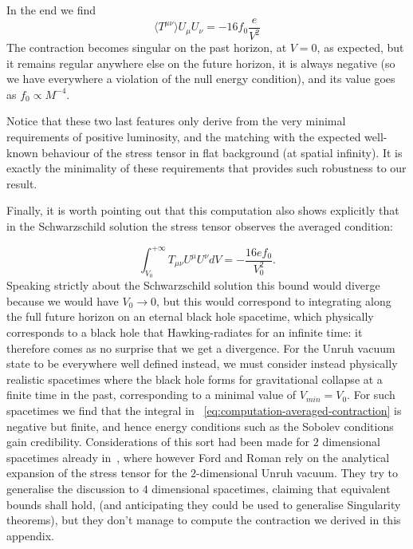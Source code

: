 In the end we find
\begin{equation}
    \label{eq:contraction-stress-tensor}
    \langle T^{\mu\nu}\rangle U_{\mu}U_{\nu} =  -16f_0\frac{e}{V^2}
\end{equation}
The contraction becomes singular on the past horizon, at \(V = 0\), as expected, but it remains regular anywhere else on the future horizon, it is always negative (so we have everywhere a violation of the null energy condition), and its value goes as \(f_0 \propto M^{-4}\). 

Notice that these two last features only derive from the very minimal requirements of positive luminosity, and the matching with the expected well-known behaviour of the stress tensor in flat background (at spatial infinity). It is exactly the minimality of these requirements that provides such robustness to our result.

Finally, it is worth pointing out that this computation also shows explicitly that in the Schwarzschild solution the stress tensor observes the averaged condition:

\begin{equation}
    \label{eq:computation-averaged-contraction}
    \int_{V_0}^{+\infty} T_{\mu\nu}U^{\mu}U^{\nu} dV = - \frac{16ef_0}{V_0^2}.
\end{equation}
Speaking strictly about the Schwarzschild solution this bound would diverge because we would have \(V_0\rightarrow 0\), but this would correspond to integrating along the full future horizon on an eternal black hole spacetime, which physically corresponds to a black hole that Hawking-radiates for an infinite time: it therefore comes as no surprise that we get a divergence.
For the Unruh vacuum state to be everywhere well defined instead, we must consider instead physically realistic spacetimes where the black hole forms for gravitational collapse at a finite time in the past, corresponding to a minimal value of \(V_{min} = V_0\). For such spacetimes we find that the integral in ~\eqref{eq:computation-averaged-contraction} is negative but finite, and hence energy conditions such as the Sobolev conditions gain credibility.
Considerations of this sort had been made for \(2\) dimensional spacetimes already in~\cite[]{ford1996averaged}, where however Ford and Roman rely on the analytical expansion of the stress tensor for the \(2\)-dimensional Unruh vacuum. They try to generalise the discussion to \(4\) dimensional spacetimes, claiming that equivalent bounds shall hold, (and anticipating they could be used to generalise Singularity theorems), but they don't manage to compute the contraction we derived in this appendix.

